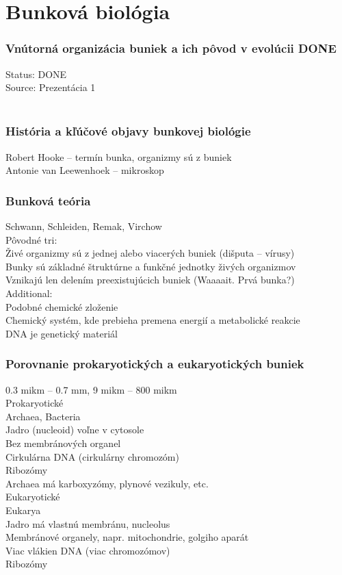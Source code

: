 \chapter[Bunková biológia]{Bunková biológia}
\label{bunkova_biologia} %

\subsection{Vnútorná organizácia buniek a ich pôvod v evolúcii DONE}
Status: DONE\\
Source: Prezentácia 1\\
\\
\subsection{História a kľúčové objavy bunkovej biológie}
Robert Hooke -- termín bunka, organizmy sú z buniek\\
Antonie van Leewenhoek -- mikroskop\\
\subsection{Bunková teória}
Schwann, Schleiden, Remak, Virchow\\
Pôvodné tri:\\
\tab Živé organizmy sú z jednej alebo viacerých buniek (dišputa -- vírusy)\\
\tab Bunky sú základné štruktúrne a funkčné jednotky živých organizmov\\
\tab Vznikajú len delením preexistujúcich buniek (Waaaait. Prvá bunka?)\\
Additional: \\
\tab Podobné chemické zloženie\\
\tab Chemický systém, kde prebieha premena energií a metabolické reakcie\\
\tab DNA je genetický materiál\\
\subsection{Porovnanie prokaryotických a eukaryotických buniek}
0.3 mikm -- 0.7 mm, 9 mikm -- 800 mikm\\
Prokaryotické\\
\tab Archaea, Bacteria\\
\tab Jadro (nucleoid) voľne v cytosole\\
\tab Bez membránových organel\\
\tab Cirkulárna DNA (cirkulárny chromozóm)\\
\tab Ribozómy\\
\tab Archaea má karboxyzómy, plynové vezikuly, etc.\\
Eukaryotické\\
\tab Eukarya\\
\tab Jadro má vlastnú membránu, nucleolus\\
\tab Membránové organely, napr. mitochondrie, golgiho aparát\\
\tab Viac vlákien DNA (viac chromozómov)\\
\tab Ribozómy\\

